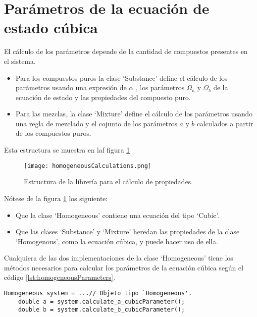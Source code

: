 \section{Parámetros de la ecuación de estado cúbica}\label{sec:parameters}

El cálculo de los parámetros depende de la cantidad de compuestos presentes en el sistema.

\begin{itemize}
 \item Para los compuestos puros la clase `Substance' define el cálculo de los parámetros usando una expresión de $\alpha$ , los parámetros $\Omega_a$ y $\Omega_b$ de la ecuación de estado y las propiedades del compuesto puro.
 \item Para las mezclas, la clase `Mixture' define el cálculo de los parámetros usando una regla de mezclado y el cojunto de los parámetros  $a$ y $b$ calculados a partir de los compuestos puros.
\end{itemize}


Esta estructura se muestra en laf figura \ref{fig:homogeneousCalculations}

\begin{figure}[!h]
  
  \centering
    \texttt{[image: homogeneousCalculations.png]}
    \caption{Estructura de la librería para el cálculo de propiedades.}
    \label{fig:homogeneousCalculations}
\end{figure}

Nótese de la figura \ref{fig:homogeneousCalculations} los siguiente:
\begin{itemize}
	\item Que la clase `Homogeneous' contiene una ecuación del tipo `Cubic'.
 	\item Que las clases `Substance' y `Mixture' heredan las propiedades de la clase `Homogenous', como la ecuación cúbica, y puede hacer uso de ella.

\end{itemize}

	Cualquiera de las dos implementaciones de la clase `Homogeneous' tiene los métodos necesarios para calcular los parámetros de la ecuación cúbica según el código \ref{lst:homogeneousParameters}.

\begin{lstlisting}[caption=Cualquier objeto tipo `Homogeneous' puede calcular los parámetros de la ecuación de estado cúbica a y b, label={lst:homogeneousParameters}]
	Homogeneous system = ...// Objeto tipo `Homogeneous'.
	double a = system.calculate_a_cubicParameter();
	double b = system.calculate_b_cubicParameter();
\end{lstlisting}


